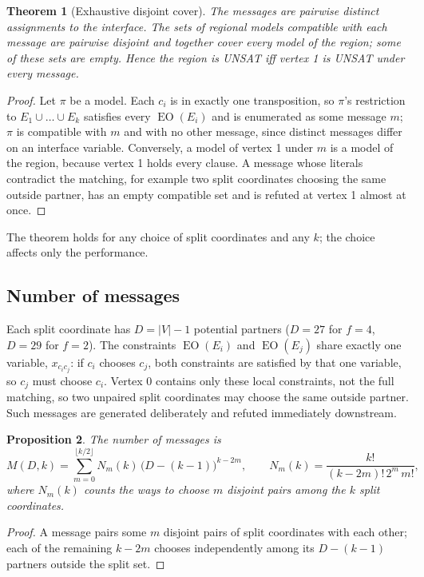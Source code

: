 \documentclass[11pt,a4paper,oneside]{report}
\newtheorem{theorem}{Theorem}[chapter]
\newtheorem{proposition}[theorem]{Proposition}
\theoremstyle{definition}
\newcommand{\EO}{\operatorname{EO}}
\begin{document}
\begin{theorem}[Exhaustive disjoint cover]\label{p8-thm:split}
The messages are pairwise distinct assignments to the interface. The sets of regional models
compatible with each message are pairwise disjoint and together cover every model of the
region; some of these sets are empty. Hence the region is UNSAT iff vertex 1 is UNSAT under
every message.
\end{theorem}
\begin{proof}
Let $\pi$ be a model. Each $c_i$ is in exactly one transposition, so $\pi$'s restriction to
$E_1\cup\dots\cup E_k$ satisfies every $\EO(E_i)$ and is enumerated as some message $m$;
$\pi$ is compatible with $m$ and with no other message, since distinct messages differ on an
interface variable. Conversely, a model of vertex 1 under $m$ is a model of the region,
because vertex 1 holds every clause. A message whose literals contradict the matching, for
example two split coordinates choosing the same outside partner, has an empty compatible set
and is refuted at vertex 1 almost at once.
\end{proof}

The theorem holds for any choice of split coordinates and any $k$; the choice affects only
the performance.

\subsection{Number of messages}

Each split coordinate has $D=|V|-1$ potential partners ($D=27$ for $f=4$, $D=29$ for $f=2$).
The constraints $\EO(E_i)$ and $\EO(E_j)$ share exactly one variable, $x_{c_ic_j}$: if $c_i$
chooses $c_j$, both constraints are satisfied by that one variable, so $c_j$ must choose
$c_i$. Vertex 0 contains only these local constraints, not the full matching, so two
unpaired split coordinates may choose the same outside partner. Such messages are generated
deliberately and refuted immediately downstream.

\begin{proposition}\label{p8-prop:M}
The number of messages is
\[
M(D,k)=\sum_{m=0}^{\lfloor k/2\rfloor} N_m(k)\,\bigl(D-(k-1)\bigr)^{k-2m},\qquad
N_m(k)=\frac{k!}{(k-2m)!\,2^m\,m!},
\]
where $N_m(k)$ counts the ways to choose $m$ disjoint pairs among the $k$ split coordinates.
\end{proposition}
\begin{proof}
A message pairs some $m$ disjoint pairs of split coordinates with each other; each of the
remaining $k-2m$ chooses independently among its $D-(k-1)$ partners outside the split set.
\end{proof}
\end{document}
